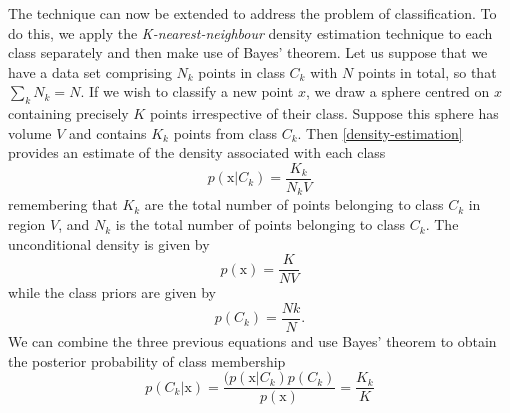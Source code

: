 The technique can now be extended to address the problem of classification. To do this, we
apply the \textit{K-nearest-neighbour} density estimation technique to each class separately
and then make use of Bayes’ theorem. Let us suppose that we have a data set comprising
$N_k$ points in class $C_k$ with $N$ points in total, so that $\sum_kN_k = N$. If we
wish to classify a new point $x$, we draw a sphere centred on $x$ containing precisely
$K$ points irrespective of their class. Suppose this sphere has volume $V$ and contains
$K_k$ points from class $C_k$. Then \ref{density-estimation} provides an estimate of the density associated with each class
$$
p(\mathrm{x}|C_k) = \frac{K_k}{N_kV}
$$
remembering that $K_k$ are the total number of points belonging to class $C_k$ in region $V$, and $N_k$ is the total number of points belonging to class $C_k$. The unconditional density is given by 
$$
p(\mathrm{x}) = \frac{K}{NV}
$$
while the class priors are given by
$$
p(C_k) = \frac{Nk}{N}.
$$
We can combine the three previous equations and use Bayes' theorem  to obtain the posterior probability of class membership
$$
p(C_k|\mathrm{x}) = \frac{(p(\mathrm{x}|C_k)p(C_k)}{p(\mathrm{x})}=\frac{K_k}{K}
$$


